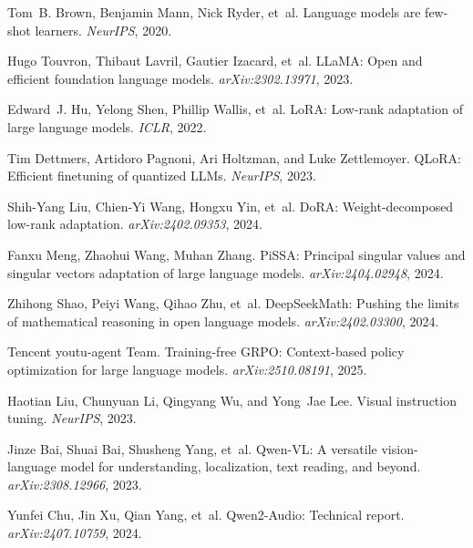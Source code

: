 \documentclass[11pt,letterpaper]{article}
\begin{document}

\begin{thebibliography}{99}

Tom~B. Brown, Benjamin Mann, Nick Ryder, et~al.
\newblock Language models are few-shot learners.
\newblock \emph{NeurIPS}, 2020.

Hugo Touvron, Thibaut Lavril, Gautier Izacard, et~al.
\newblock LLaMA: Open and efficient foundation language models.
\newblock \emph{arXiv:2302.13971}, 2023.

Edward~J. Hu, Yelong Shen, Phillip Wallis, et~al.
\newblock LoRA: Low-rank adaptation of large language models.
\newblock \emph{ICLR}, 2022.

Tim Dettmers, Artidoro Pagnoni, Ari Holtzman, and Luke Zettlemoyer.
\newblock QLoRA: Efficient finetuning of quantized LLMs.
\newblock \emph{NeurIPS}, 2023.

Shih-Yang Liu, Chien-Yi Wang, Hongxu Yin, et~al.
\newblock DoRA: Weight-decomposed low-rank adaptation.
\newblock \emph{arXiv:2402.09353}, 2024.

Fanxu Meng, Zhaohui Wang, Muhan Zhang.
\newblock PiSSA: Principal singular values and singular vectors adaptation of large language models.
\newblock \emph{arXiv:2404.02948}, 2024.

Zhihong Shao, Peiyi Wang, Qihao Zhu, et~al.
\newblock DeepSeekMath: Pushing the limits of mathematical reasoning in open language models.
\newblock \emph{arXiv:2402.03300}, 2024.

Tencent youtu-agent Team.
\newblock Training-free GRPO: Context-based policy optimization for large language models.
\newblock \emph{arXiv:2510.08191}, 2025.

Haotian Liu, Chunyuan Li, Qingyang Wu, and Yong~Jae Lee.
\newblock Visual instruction tuning.
\newblock \emph{NeurIPS}, 2023.

Jinze Bai, Shuai Bai, Shusheng Yang, et~al.
\newblock Qwen-VL: A versatile vision-language model for understanding, localization, text reading, and beyond.
\newblock \emph{arXiv:2308.12966}, 2023.

Yunfei Chu, Jin Xu, Qian Yang, et~al.
\newblock Qwen2-Audio: Technical report.
\newblock \emph{arXiv:2407.10759}, 2024.


\end{thebibliography}
\end{document}

